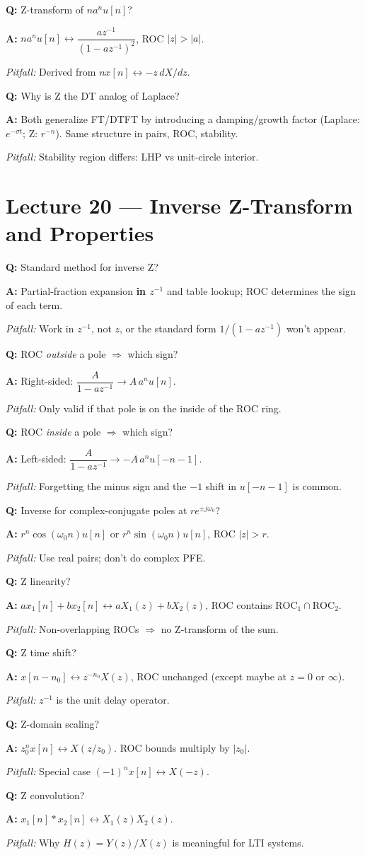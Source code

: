 \documentclass[11pt]{article}
\newcommand{\Q}[1]{\par\medskip\noindent\textbf{Q:} #1}
\newcommand{\A}[1]{\par\noindent\textbf{A:} #1}
\newcommand{\Pit}[1]{\par\noindent\textit{Pitfall:} #1}
\begin{document}
\Q{Z-transform of $na^n u[n]$?}
\A{$na^n u[n]\leftrightarrow \dfrac{az^{-1}}{(1-az^{-1})^2}$, ROC $|z|>|a|$.}
\Pit{Derived from $nx[n]\leftrightarrow -z\,dX/dz$.}

\Q{Why is Z the DT analog of Laplace?}
\A{Both generalize FT/DTFT by introducing a damping/growth factor (Laplace: $e^{-\sigma t}$; Z: $r^{-n}$). Same structure in pairs, ROC, stability.}
\Pit{Stability region differs: LHP vs unit-circle interior.}

\section{Lecture 20 --- Inverse Z-Transform and Properties}

\Q{Standard method for inverse Z?}
\A{Partial-fraction expansion \textbf{in $z^{-1}$} and table lookup; ROC determines the sign of each term.}
\Pit{Work in $z^{-1}$, not $z$, or the standard form $1/(1-az^{-1})$ won't appear.}

\Q{ROC \emph{outside} a pole $\Rightarrow$ which sign?}
\A{Right-sided: $\dfrac{A}{1-az^{-1}} \rightarrow A\,a^n u[n]$.}
\Pit{Only valid if that pole is on the inside of the ROC ring.}

\Q{ROC \emph{inside} a pole $\Rightarrow$ which sign?}
\A{Left-sided: $\dfrac{A}{1-az^{-1}} \rightarrow -A\,a^n u[-n-1]$.}
\Pit{Forgetting the minus sign and the $-1$ shift in $u[-n-1]$ is common.}

\Q{Inverse for complex-conjugate poles at $re^{\pm j\omega_0}$?}
\A{$r^n\cos(\omega_0 n)u[n]$ or $r^n\sin(\omega_0 n)u[n]$, ROC $|z|>r$.}
\Pit{Use real pairs; don't do complex PFE.}

\Q{Z linearity?}
\A{$ax_1[n]+bx_2[n]\leftrightarrow aX_1(z)+bX_2(z)$, ROC contains $\text{ROC}_1\cap\text{ROC}_2$.}
\Pit{Non-overlapping ROCs $\Rightarrow$ no Z-transform of the sum.}

\Q{Z time shift?}
\A{$x[n-n_0]\leftrightarrow z^{-n_0}X(z)$, ROC unchanged (except maybe at $z=0$ or $\infty$).}
\Pit{$z^{-1}$ is the unit delay operator.}

\Q{Z-domain scaling?}
\A{$z_0^n x[n]\leftrightarrow X(z/z_0)$. ROC bounds multiply by $|z_0|$.}
\Pit{Special case $(-1)^n x[n]\leftrightarrow X(-z)$.}

\Q{Z convolution?}
\A{$x_1[n]*x_2[n]\leftrightarrow X_1(z)X_2(z)$.}
\Pit{Why $H(z)=Y(z)/X(z)$ is meaningful for LTI systems.}
\end{document}
